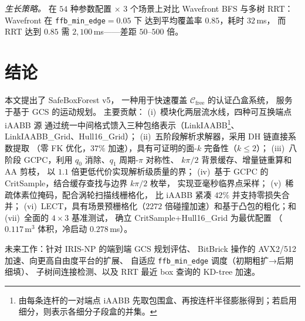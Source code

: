 \documentclass[journal]{IEEEtran}
\newcommand{\Cfree}{\mathcal{C}_\text{free}}
\newcommand{\LinkIAABBDef}{由每条连杆的一对端点 iAABB 先取包围盒、再按连杆半径膨胀得到；若启用细分，则表示各细分子段盒的并集。}
\begin{document}
\emph{生长策略。}
在 $54$ 种参数配置 $\times$ $3$ 个场景上对比
Wavefront BFS 与多树 RRT：
Wavefront 在 \texttt{ffb\_min\_edge}${}=0.05$ 下
达到平均覆盖率 $0.85$，耗时 $32$\,ms，
而 RRT 达到 $0.85$ 需 $2{,}100$\,ms——差距 $50$--$500$ 倍。

\section{结论}\label{sec:conclusion}

本文提出了 SafeBoxForest v5，
一种用于快速覆盖 $\Cfree$ 的认证凸盒系统，
服务于基于 GCS 的运动规划。
主要贡献：
(i)~模块化两层流水线，四种可互换端点 iAABB 源
通过统一中间格式馈入三种包络表示（LinkIAABB\footnote{\LinkIAABBDef}、LinkIAABB\_Grid、Hull16\_Grid）；
(ii)~五阶段解析求解器，采用 DH 链直接系数提取
（零 FK 优化，$37\%$ 加速），具有可证明的面-$k$ 完备性（$k \leq 2$）；
(iii)~八阶段 GCPC，利用 $q_0$ 消除、$q_1$ 周期-$\pi$ 对称性、
$k\pi/2$ 背景缓存、增量链重算和 AA 剪枝，
以 $1.1$ 倍更低代价实现解析级质量的界；
(iv)~基于 GCPC 的 CritSample，结合缓存查找与边界 $k\pi/2$ 枚举，
实现亚毫秒临界点采样；
(v)~稀疏体素位掩码，配合涡轮扫描线栅格化，
比 iAABB 紧凑 $42\%$ 并支持零损失合并；
(vi)~LECT，具有场景预栅格化（$2272$ 倍碰撞加速）和基于凸包的粗化；和
(vii)~全面的 $4{\times}3$ 基准测试，
确立 CritSample+Hull16\_Grid 为最优配置
（$0.117$\,m$^3$ 体积，冷启动 $0.278$\,ms）。

未来工作：针对 IRIS-NP 的端到端 GCS 规划评估、
BitBrick 操作的 AVX2/512 加速、向更高自由度平台的扩展、
自适应 \texttt{ffb\_min\_edge} 调度（初期粗扩→后期细填）、
子树间连接检测、以及 RRT 最近 box 查询的 KD-tree 加速。



\end{document}

